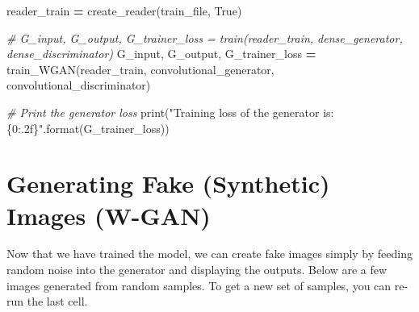 \documentclass[]{book}
\newenvironment{Shaded}{\begin{snugshade}}{\end{snugshade}}
\newcommand{\SpecialCharTok}[1]{\textcolor[rgb]{0.00,0.00,0.00}{#1}}
\newcommand{\StringTok}[1]{\textcolor[rgb]{0.31,0.60,0.02}{#1}}
\newcommand{\CommentTok}[1]{\textcolor[rgb]{0.56,0.35,0.01}{\textit{#1}}}
\newcommand{\VariableTok}[1]{\textcolor[rgb]{0.00,0.00,0.00}{#1}}
\newcommand{\OperatorTok}[1]{\textcolor[rgb]{0.81,0.36,0.00}{\textbf{#1}}}
\newcommand{\BuiltInTok}[1]{#1}
\newcommand{\NormalTok}[1]{#1}
\theoremstyle{definition}
\theoremstyle{definition}
\theoremstyle{definition}
\theoremstyle{remark}
\begin{document}
\begin{Shaded}
\begin{Highlighting}[]
\NormalTok{reader_train }\OperatorTok{=}\NormalTok{ create_reader(train_file, }\VariableTok{True}\NormalTok{)}

\CommentTok{# G_input, G_output, G_trainer_loss = train(reader_train, dense_generator, dense_discriminator)}
\NormalTok{G_input, G_output, G_trainer_loss }\OperatorTok{=}\NormalTok{ train_WGAN(reader_train,}
\NormalTok{                                          convolutional_generator,}
\NormalTok{                                          convolutional_discriminator)}
\end{Highlighting}
\end{Shaded}

\begin{Shaded}
\begin{Highlighting}[]
\CommentTok{# Print the generator loss }
\BuiltInTok{print}\NormalTok{(}\StringTok{"Training loss of the generator is: }\SpecialCharTok{\{0:.2f\}}\StringTok{"}\NormalTok{.}\BuiltInTok{format}\NormalTok{(G_trainer_loss))}
\end{Highlighting}
\end{Shaded}

\section{Generating Fake (Synthetic) Images
(W-GAN)}\label{generating-fake-synthetic-images-w-gan}

Now that we have trained the model, we can create fake images simply by
feeding random noise into the generator and displaying the outputs.
Below are a few images generated from random samples. To get a new set
of samples, you can re-run the last cell.
\end{document}

